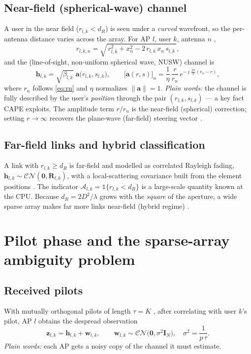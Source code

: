 \documentclass[11pt]{article}
\newcommand{\norm}[1]{\left\|#1\right\|}
\newcommand{\vh}{\mathbf{h}}
\newcommand{\vz}{\mathbf{z}}
\newcommand{\vw}{\mathbf{w}}
\newcommand{\va}{\mathbf{a}}
\newcommand{\mR}{\mathbf{R}}
\newcommand{\mI}{\mathbf{I}}
\begin{document}
\subsection{Near-field (spherical-wave) channel}
A user in the near field ($r_{l,k}<d_R$) is seen under a \emph{curved} wavefront, so the per-antenna
distance varies across the array. For AP $l$, user $k$, antenna $n$ \cite{cui2022channel,lu2024tutorial},
\begin{equation}
r_{l,k,n}=\sqrt{\,r_{l,k}^2+x_n^2-2\,r_{l,k}\,x_n\,s_{l,k}\,},
\label{eq:rn}
\end{equation}
and the (line-of-sight, non-uniform spherical wave, NUSW) channel is
\begin{equation}
\boxed{\;\vh_{l,k}=\sqrt{\beta_{l,k}}\;\va\big(r_{l,k},s_{l,k}\big),\qquad
\big[\va(r,s)\big]_n=\frac{1}{\eta}\,\frac{r}{r_n}\,
e^{-\jmath\frac{2\pi}{\lambda}(r_n-r)},\;}
\label{eq:nusw}
\end{equation}
where $r_n$ follows \eqref{eq:rn} and $\eta$ normalizes $\norm{\va}=1$. \emph{Plain words:} the
channel is fully described by the user's \emph{position} through the pair $(r_{l,k},s_{l,k})$ --- a
key fact CAPE exploits. The amplitude term $r/r_n$ is the near-field (spherical) correction; setting
$r\!\to\!\infty$ recovers the plane-wave (far-field) steering vector \cite{cui2022channel}.

\subsection{Far-field links and hybrid classification}
A link with $r_{l,k}\ge d_R$ is far-field and modelled as correlated Rayleigh fading,
$\vh_{l,k}\sim\mathcal{CN}(\mathbf 0,\mR_{l,k})$, with a local-scattering covariance built from the
element positions \cite{bjornson2021primer}. The indicator $\mathcal{A}_{l,k}=\mathbb{1}\{r_{l,k}<d_R\}$
is a large-scale quantity known at the CPU. Because $d_R=2D^2/\lambda$ grows with the \emph{square}
of the aperture, a wide sparse array makes far more links near-field (hybrid regime)
\cite{zhou2025sparse,lu2024tutorial}.

\section{Pilot phase and the sparse-array ambiguity problem}

\subsection{Received pilots}
With mutually orthogonal pilots of length $\tau=K$ \cite{ngo2017cellfree}, after correlating with
user $k$'s pilot, AP $l$ obtains the despread observation
\begin{equation}
\vz_{l,k}=\vh_{l,k}+\vw_{l,k},\qquad \vw_{l,k}\sim\mathcal{CN}\!\big(\mathbf 0,\sigma^2\mI_N\big),
\quad \sigma^2=\frac{1}{p\,\tau}.
\label{eq:despread}
\end{equation}
\emph{Plain words:} each AP gets a noisy copy of the channel it must estimate.
\end{document}
